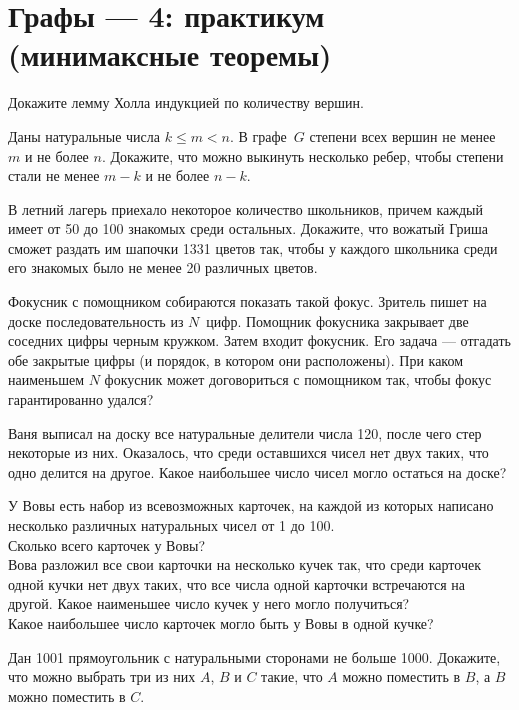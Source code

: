 
\section*{Графы --- 4: практикум (минимаксные теоремы)}


\begin{problems}

\item
Докажите лемму Холла индукцией по количеству вершин.

\item
Даны натуральные числа $k \leq m < n$.
В графе~$G$ степени всех вершин не менее $m$ и не более $n$.
Докажите, что можно выкинуть несколько ребер, чтобы степени стали не менее
$m - k$ и не более $n - k$.

\item
В летний лагерь приехало некоторое количество школьников, причем каждый имеет
от 50 до 100 знакомых среди остальных.
Докажите, что вожатый Гриша сможет раздать им шапочки 1331 цветов так, чтобы
у каждого школьника среди его знакомых было не менее 20 различных цветов.

\item
Фокусник с помощником собираются показать такой фокус.
Зритель пишет на доске последовательность из $N$~цифр.
Помощник фокусника закрывает две соседних цифры черным кружком.
Затем входит фокусник.
Его задача --- отгадать обе закрытые цифры (и порядок, в котором они
расположены).
При каком наименьшем $N$ фокусник может договориться с помощником так, чтобы
фокус гарантированно удался?

\item
Ваня выписал на доску все натуральные делители числа 120, после чего стер
некоторые из них.
Оказалось, что среди оставшихся чисел нет двух таких, что одно делится
на другое.
Какое наибольшее число чисел могло остаться на доске?

\item
У Вовы есть набор из всевозможных карточек, на каждой из которых написано
несколько различных натуральных чисел от 1 до 100.
\\
\sp
Сколько всего карточек у Вовы?
\\
\sp
Вова разложил все свои карточки на несколько кучек так, что среди карточек
одной кучки нет двух таких, что все числа одной карточки встречаются на другой.
Какое наименьшее число кучек у него могло получиться?
\\
\sp
Какое наибольшее число карточек могло быть у Вовы в одной кучке?

\item
Дан 1001 прямоугольник с натуральными сторонами не больше 1000.
Докажите, что можно выбрать три из них $A$, $B$ и $C$ такие, что $A$ можно
поместить в $B$, а $B$ можно поместить в $C$.

\end{problems}

